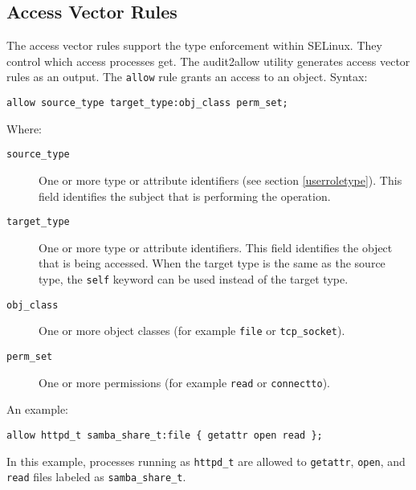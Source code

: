 \subsection{Access Vector Rules}
\label{avrules}
The access vector rules support the type enforcement within SELinux. They
control which access processes get. The audit2allow utility generates access
vector rules as an output. The \texttt{allow} rule grants an access to an
object. Syntax:
\begin{lstlisting}[language=te]
allow source_type target_type:obj_class perm_set;
\end{lstlisting}
Where:
\begin{description}
    \item [\texttt{source\_type}] One or more type or attribute identifiers (see
        section \ref{userroletype}). This field identifies the subject that is
        performing the operation.
    \item [\texttt{target\_type}] One or more type or attribute identifiers.
        This field identifies the object that is being accessed. When the
        target type is the same as the source type, the \texttt{self} keyword
        can be used instead of the target type.
    \item [\texttt{obj\_class}] One or more object classes (for example
        \texttt{file} or \texttt{tcp\_socket}).
    \item [\texttt{perm\_set}] One or more permissions (for example
        \texttt{read} or \texttt{connectto}).
\end{description}
An example:
\begin{lstlisting}[language=te]
allow httpd_t samba_share_t:file { getattr open read };
\end{lstlisting}
In this example, processes running as \texttt{httpd\_t} are allowed to
\texttt{getattr}, \texttt{open}, and \texttt{read} files labeled as
\texttt{samba\_share\_t}.

